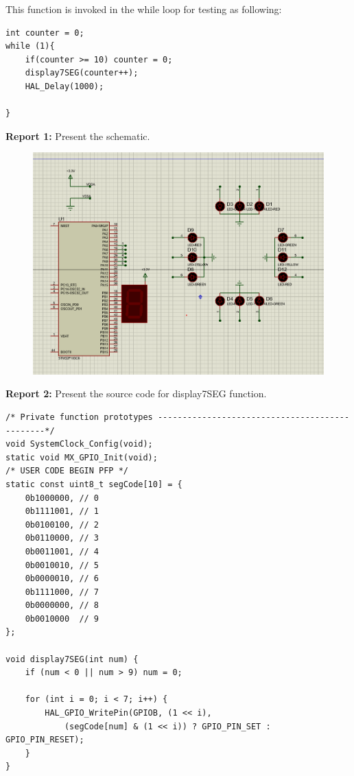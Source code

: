 \newpage
This function is invoked in the while loop for testing as following:
\begin{lstlisting}[caption=An example for your source code]
int counter = 0;
while (1){
    if(counter >= 10) counter = 0;    
    display7SEG(counter++);
    HAL_Delay(1000);

}
\end{lstlisting}

\textbf{Report 1: } Present the schematic.
\begin{figure}[H]
    \centering
    \includegraphics[width=5in]{source/picture/bai_1/EX3_4_sche.PNG}
\end{figure}
\textbf{Report 2: } Present the source code for display7SEG function.
\begin{lstlisting}[caption=Function Implementation]
/* Private function prototypes -----------------------------------------------*/
void SystemClock_Config(void);
static void MX_GPIO_Init(void);
/* USER CODE BEGIN PFP */
static const uint8_t segCode[10] = {
    0b1000000, // 0
    0b1111001, // 1
    0b0100100, // 2
    0b0110000, // 3
    0b0011001, // 4
    0b0010010, // 5
    0b0000010, // 6
    0b1111000, // 7
    0b0000000, // 8
    0b0010000  // 9
};

void display7SEG(int num) {
    if (num < 0 || num > 9) num = 0;

    for (int i = 0; i < 7; i++) {
        HAL_GPIO_WritePin(GPIOB, (1 << i),
            (segCode[num] & (1 << i)) ? GPIO_PIN_SET : GPIO_PIN_RESET);
    }
}

\end{lstlisting}
